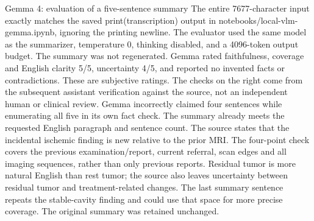 \documentclass[aspectratio=169,12pt]{beamer}
\begin{document}
\begin{frame}{Gemma 4: evaluation of a five-sentence summary}
{The entire 7677-character input exactly matches the saved print(transcription)
output in notebooks/local-vlm-gemma.ipynb, ignoring the printing newline.
The evaluator used the same model as the summarizer, temperature 0,
thinking disabled, and a 4096-token output budget. The summary was not regenerated.
Gemma rated faithfulness, coverage and English clarity 5/5, uncertainty 4/5,
and reported no invented facts or contradictions. These are subjective ratings.
The checks on the right come from the subsequent assistant verification against
the source, not an independent human or clinical review.
Gemma incorrectly claimed four sentences while enumerating all five in its own
fact check. The summary already meets the requested English paragraph and sentence count.
The source states that the incidental ischemic finding is new relative to the prior MRI.
The four-point check covers the previous examination/report, current referral,
scan edges and all imaging sequences, rather than only previous reports.
Residual tumor is more natural English than rest tumor; the source also leaves
uncertainty between residual tumor and treatment-related changes.
The last summary sentence repeats the stable-cavity finding and could use that space
for more precise coverage. The original summary was retained unchanged.}
\end{frame}
\end{document}
